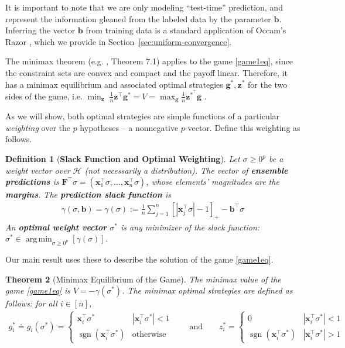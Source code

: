 \documentclass{article}
\newtheorem{thm}{Theorem}%
\newtheorem{defn}[thm]{Definition}
\DeclareMathOperator*{\argmin}{arg\,min}
\DeclareMathOperator{\sgn}{sgn}
\newcommand{\abs}[1]{\left| #1 \right|}
\newcommand{\vF}{\mathbf{F}}
\newcommand{\vx}{\mathbf{x}}
\newcommand{\vb}{\mathbf{b}}
\newcommand{\vg}{\mathbf{g}}
\newcommand{\vz}{\mathbf{z}}
\newcommand{\cH}{\mathcal{H}}
\begin{document}
It is important to note that we are only modeling ``test-time''
prediction, and represent the information gleaned from the labeled data
by the parameter $\vb$. Inferring the vector $\vb$ from training data
is a standard application of Occam's Razor \cite{BEHW87}, which we provide in
Section~\ref{sec:uniform-convergence}.

The minimax theorem (e.g. \cite{CBL06}, Theorem 7.1) applies to the game \eqref{game1eq}, 
since the constraint sets are convex and compact and the payoff linear. 
Therefore, it has a minimax equilibrium and associated optimal 
strategies $\vg^*, \vz^*$ for the two sides of the game, i.e. 
$\min_{\vz}\; \frac{1}{n} \vz^\top \vg^* = V = \max_{\vg} \frac{1}{n} \vz^{*^\top} \vg$ .

As we will show, both optimal strategies are simple functions of a
particular \emph{weighting} over the $p$ hypotheses -- a nonnegative $p$-vector. 
Define this weighting as follows.
\begin{defn}[\textbf{Slack Function and Optimal Weighting}]
Let $\sigma \geq 0^p$ be a weight vector over $\cH$ (not necessarily a distribution).
The vector of \textbf{ensemble predictions} is
$\vF^\top \sigma = (\vx_1^\top \sigma, \dots, \vx_n^\top \sigma)$, 
whose elements' magnitudes are the \textbf{margins}. 
The \textbf{prediction slack function} is
\begin{align}
\label{eqn:slack}
\gamma (\sigma, \vb) = \gamma (\sigma) := \frac{1}{n} \sum_{j=1}^n \left[ \abs{\vx_{j}^\top \sigma} - 1 \right]_{+} - \vb^\top \sigma
\end{align}
An \textbf{optimal weight vector} $\sigma^*$ is any minimizer of the slack function: 
$\displaystyle \sigma^* \in \argmin_{\sigma \geq 0^p} \left[ \gamma (\sigma) \right]$.
\end{defn}

Our main result uses these to describe the solution of the game \eqref{game1eq}.
\begin{thm}[Minimax Equilibrium of the Game]
\label{thm:gamesolngen}
The minimax value of the game \eqref{game1eq} is 
$V = - \gamma (\sigma^*)$. 
The minimax optimal strategies are defined as follows:
for all $i \in [n]$,
\begin{align}
g_i^* \doteq g_i (\sigma^*) = \begin{cases} \vx_{i}^\top \sigma^* & \abs{\vx_{i}^\top \sigma^*} < 1 \\ 
\sgn(\vx_{i}^\top \sigma^*) & \mbox{otherwise} \end{cases}
\quad \quad \text{and} \quad \quad
z_i^* = 
\begin{cases} 
0 & \abs{\vx_{i}^\top \sigma^*} < 1 \\ 
\sgn(\vx_{i}^\top \sigma^*) & \abs{\vx_{i}^\top \sigma^*} > 1 
\end{cases}
\label{eqn:opt-strats}
\end{align}
\end{thm}
\end{document}
